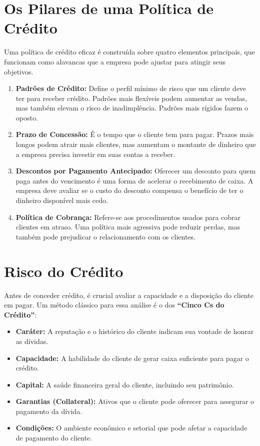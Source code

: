 \documentclass[
  a4paper,
]{book}
\providecommand{\tightlist}{%
  \setlength{\itemsep}{0pt}\setlength{\parskip}{0pt}}\usepackage{longtable,booktabs,array}
\begin{document}
\section{Os Pilares de uma Política de
Crédito}\label{os-pilares-de-uma-poluxedtica-de-cruxe9dito}

Uma política de crédito eficaz é construída sobre quatro elementos
principais, que funcionam como alavancas que a empresa pode ajustar para
atingir seus objetivos.

\begin{enumerate}
\def\labelenumi{\arabic{enumi}.}
\tightlist
\item
  \textbf{Padrões de Crédito:} Define o perfil mínimo de risco que um
  cliente deve ter para receber crédito. Padrões mais flexíveis podem
  aumentar as vendas, mas também elevam o risco de inadimplência.
  Padrões mais rígidos fazem o oposto.
\item
  \textbf{Prazo de Concessão:} É o tempo que o cliente tem para pagar.
  Prazos mais longos podem atrair mais clientes, mas aumentam o montante
  de dinheiro que a empresa precisa investir em suas contas a receber.
\item
  \textbf{Descontos por Pagamento Antecipado:} Oferecer um desconto para
  quem paga antes do vencimento é uma forma de acelerar o recebimento de
  caixa. A empresa deve avaliar se o custo do desconto compensa o
  benefício de ter o dinheiro disponível mais cedo.
\item
  \textbf{Política de Cobrança:} Refere-se aos procedimentos usados para
  cobrar clientes em atraso. Uma política mais agressiva pode reduzir
  perdas, mas também pode prejudicar o relacionamento com os clientes.
\end{enumerate}

\section{Risco do Crédito}\label{risco-do-cruxe9dito}

Antes de conceder crédito, é crucial avaliar a capacidade e a disposição
do cliente em pagar. Um método clássico para essa análise é o dos
\textbf{``Cinco Cs do Crédito''}:

\begin{itemize}
\tightlist
\item
  \textbf{Caráter:} A reputação e o histórico do cliente indicam sua
  vontade de honrar as dívidas.
\item
  \textbf{Capacidade:} A habilidade do cliente de gerar caixa suficiente
  para pagar o crédito.
\item
  \textbf{Capital:} A saúde financeira geral do cliente, incluindo seu
  patrimônio.
\item
  \textbf{Garantias (Collateral):} Ativos que o cliente pode oferecer
  para assegurar o pagamento da dívida.
\item
  \textbf{Condições:} O ambiente econômico e setorial que pode afetar a
  capacidade de pagamento do cliente.
\end{itemize}
\end{document}
